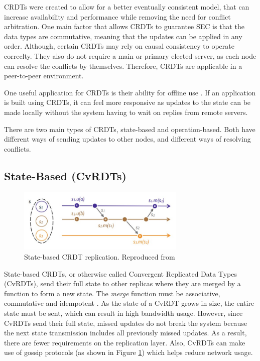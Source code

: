 \documentclass[12pt]{report}
\begin{document}
CRDTs were created to allow for a better eventually consistent model, that can increase availability and performance while removing the need for conflict arbitration.  One main factor that allows CRDTs to guarantee SEC is that the data types are commutative\cite{10.1007/978-3-642-24550-3_29}, meaning that the updates can be applied in any order. Although, certain CRDTs may rely on causal consistency to operate correclty. They also do not require a main or primary elected server, as each node can resolve the conflicts by themselves. Therefore, CRDTs are applicable in a peer-to-peer environment. \par
One useful application for CRDTs is their ability for offline use \cite{10.1145/3359591.3359737}. If an application is built using CRDTs, it can feel more responsive as updates to the state can be made locally without the system having to wait on replies from remote servers. \par
There are two main types of CRDTs, state-based and operation-based. Both have different ways of sending updates to other nodes, and different ways of resolving conflicts. \par


\subsection{State-Based (CvRDTs)}

\begin{figure}
    \centering
    \includegraphics[width=8cm]{state.jpg}
    \caption{State-based CRDT replication. Reproduced from \cite{10.1007/978-3-642-24550-3_29}}
    \label{fig:statebased}
\end{figure}

State-based CRDTs, or otherwise called Convergent Replicated Data Types (CvRDTs), send their full state to other replicas where they are merged by a function to form a new state. The \textit{merge} function must be associative, commutative and idempotent \cite{10.1007/978-3-642-24550-3_29}. As the state of a CvRDT grows in size, the entire state must be sent, which can result in high bandwidth usage. However, since CvRDTs send their full state, missed updates do not break the system because the next state transmission includes all previously missed updates. As a result, there are fewer requirements on the replication layer. Also, CvRDTs can make use of gossip protocols (as shown in Figure \ref{fig:statebased}) which helps reduce network usage. \par
\end{document}
